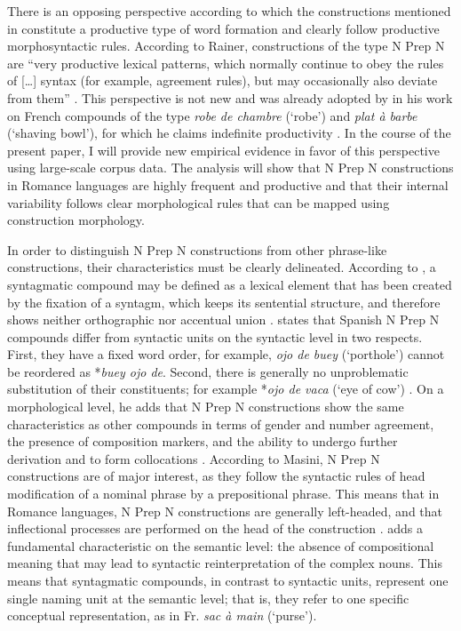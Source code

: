 \documentclass[output=paper]{langsci/langscibook}
\begin{document}
There is an opposing perspective according to which the constructions mentioned in  constitute a productive type of word formation and clearly follow productive morphosyntactic rules. According to Rainer, constructions of the type N Prep N are “very productive lexical patterns, which normally continue to obey the rules of […] syntax (for example, agreement rules), but may occasionally also deviate from them” \citep[2724]{Rainer:2016}. This perspective is not new and was already adopted by \citet{Benveniste:1974} in his work on French compounds of the type \textit {robe de chambre} (`robe') and \textit {plat à barbe} (`shaving bowl'), for which he claims indefinite productivity \citep[172]{Benveniste:1974}. In the course of the present paper, I will provide new empirical evidence in favor of this perspective using large-scale corpus data. The analysis will show that N Prep N constructions in Romance languages are highly frequent and productive and that their internal variability follows clear morphological rules that can be mapped using construction morphology.

In order to distinguish N Prep N constructions from other phrase-like constructions, their characteristics must be clearly delineated. According to \citet{BuenafuentesdelaMata:2010}, a syntagmatic compound may be defined as a lexical element that has been created by the fixation of a syntagm, which keeps its sentential structure, and therefore shows neither orthographic nor accentual union \citep[21ff.]{BuenafuentesdelaMata:2010}.  states that Spanish N Prep N compounds differ from syntactic units on the syntactic level in two respects. First, they have a fixed word order, for example, \textit{ojo de buey} (`porthole') cannot be reordered as *\textit {buey ojo de}. Second, there is generally no unproblematic substitution of their constituents; for example *\textit{ojo de vaca} (`eye of cow') \citep[4825]{ValAlvaro:1999}. On a morphological level, he adds that N Prep N constructions show the same characteristics as other compounds in terms of gender and number agreement, the presence of composition markers, and the ability to undergo further derivation and to form collocations \citep[77]{BustosGisbert:1986}. According to Masini, N Prep N constructions are of major interest, as they follow the syntactic rules of head modification of a nominal phrase by a prepositional phrase. This means that in Romance languages, N Prep N constructions are generally left-headed, and that inflectional processes are performed on the head of the construction \citep[257]{Masini:2009}. \citet[4827]{ValAlvaro:1999} adds a fundamental characteristic on the semantic level: the absence of compositional meaning that may lead to syntactic reinterpretation of the complex nouns. This means that syntagmatic compounds, in contrast to syntactic units, represent one single naming unit at the semantic level; that is, they refer to one specific conceptual representation, as in Fr. \textit{sac à main} (`purse').
\end{document}
